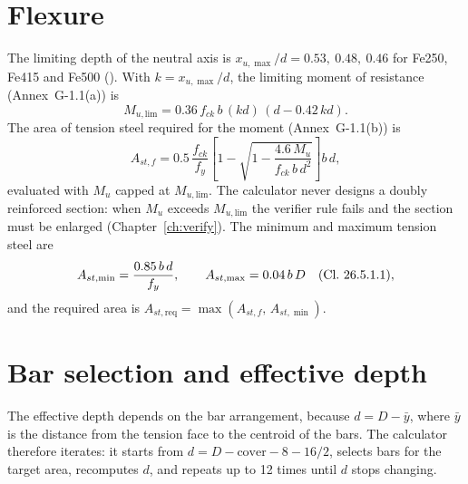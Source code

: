 \section{Flexure}
The limiting depth of the neutral axis is $x_{u,\max}/d = 0.53,\ 0.48,\ 0.46$ for Fe250, Fe415 and Fe500 (). With $k = x_{u,\max}/d$, the limiting moment of resistance (Annex~G-1.1(a)) is
\begin{equation}
  M_{u,\mathrm{lim}} = 0.36\,f_{ck}\,b\,(k d)\,(d - 0.42\,k d).
\end{equation}
The area of tension steel required for the moment (Annex~G-1.1(b)) is
\begin{equation}
  A_{st,f} = 0.5\,\frac{f_{ck}}{f_y}\left[1-\sqrt{1-\frac{4.6\,M_u}{f_{ck}\,b\,d^{2}}}\right] b\,d,
\end{equation}
evaluated with $M_u$ capped at $M_{u,\mathrm{lim}}$. The calculator never designs a doubly reinforced section: when $M_u$ exceeds $M_{u,\mathrm{lim}}$ the verifier rule  fails and the section must be enlarged (Chapter~\ref{ch:verify}). The minimum and maximum tension steel are
\begin{equation}
  A_{st,\min} = \frac{0.85\,b\,d}{f_y}, \qquad A_{st,\max} = 0.04\,b\,D \quad(\text{Cl.~26.5.1.1}),
\end{equation}
and the required area is $A_{st,\mathrm{req}} = \max(A_{st,f},\,A_{st,\min})$.

\section{Bar selection and effective depth}
The effective depth depends on the bar arrangement, because $d = D - \bar y$, where $\bar y$ is the distance from the tension face to the centroid of the bars. The calculator therefore iterates: it starts from $d = D - \text{cover} - 8 - 16/2$, selects bars for the target area, recomputes $d$, and repeats up to 12 times until $d$ stops changing.

